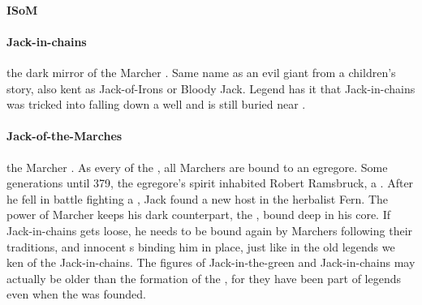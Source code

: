 \paragraph{ISoM} 
\paragraph{Jack-in-chains} the dark mirror of the Marcher  . Same name as an evil giant from a children's story, also kent as Jack-of-Irons or Bloody Jack. Legend has it that Jack-in-chains was tricked into falling down a well and is still buried near .
\paragraph{Jack-of-the-Marches} the Marcher . As every  of the , all Marchers are bound to an egregore. Some generations until 379, the egregore's spirit inhabited Robert Ramsbruck, a . After he fell in battle fighting a , Jack found a new host in the herbalist Fern. The power of Marcher  keeps his dark counterpart, the , bound deep in his core. If Jack-in-chains gets loose, he needs to be bound again by Marchers following their traditions, and innocent s binding him in place, just like in the old legends we ken of the Jack-in-chains. The figures of Jack-in-the-green and Jack-in-chains may actually be older than the formation of the , for they have been part of legends even when the  was founded.
